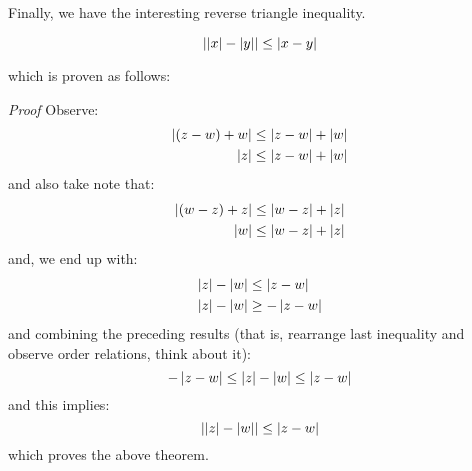 Finally, we have the interesting reverse triangle inequality.

\[ \left| \left| x \right| - \left| y \right| \right| \leq \left| x-y \right| \]

which is proven as follows:

\textit{Proof} Observe:
\begin{align*}
\left| (z-w)+w \right| &\leq \left| z-w \right| + \left| w \right| \\
\left| z \right| &\leq \left| z-w \right| + \left| w \right|
\end{align*}
and also take note that:
\begin{align*}
\left| (w-z) + z \right| &\leq \left| w-z \right| + \left| z \right| \\
\left| w \right| &\leq \left| w-z \right| + \left| z \right|
\end{align*}
and, we end up with:
\begin{align*}
\left| z \right| - \left| w \right| &\leq \left| z-w \right| \\
\left| z \right| - \left| w \right| &\geq -\left| z-w \right|
\end{align*}
and combining the preceding results (that is, rearrange last inequality and observe order relations, think about it):
\[ -\left| z-w \right| \leq \left| z \right| - \left| w \right| \leq \left| z-w \right|  \]
and this implies:
\[ \left| \left| z \right| - \left| w \right| \right| \leq \left| z - w \right| \]
which proves the above theorem.




 



